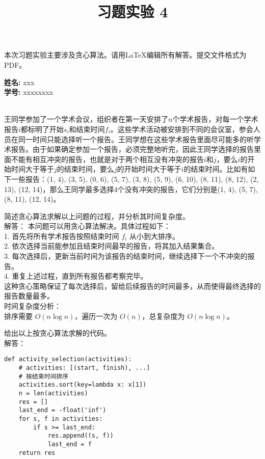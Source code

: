 \documentclass[12pt,twoside]{article}
\title{ 习题实验 4}
\newcommand{\theproblemsetnum}{4}
\newcommand{\releasedate}{2025.4.17}
\begin{document}
\handout{习题实验 \theproblemsetnum}{\releasedate}
本次习题实验主要涉及贪心算法。请用\LaTeX 编辑所有解答。提交文件格式为PDF。

\setlength{\parindent}{0pt}
\medskip\hrulefill\medskip

{\bf 姓名:} xxx\\
{\bf 学号:} xxxxxxxx

\medskip

\medskip\hrulefill

\begin{problems}
\\
王同学参加了一个学术会议，组织者在第一天安排了$n$个学术报告，对每一个学术报告$i$都标明了开始$s_i$和结束时间$f_i$。这些学术活动被安排到不同的会议室，参会人员在同一时间只能选择听一个报告。王同学想在这些学术报告里面尽可能多的听学术报告。由于如果确定参加一个报告，必须完整地听完，因此王同学选择的报告里面不能有相互冲突的报告，也就是对于两个相互没有冲突的报告$i$和$j$，要么$i$的开始时间大于等于$j$的结束时间，要么$j$的开始时间大于等于$i$的结束时间。比如有如下一些报告：(1, 4), (3, 5), (0, 6), (5, 7), (3, 8), (5, 9), (6, 10), (8, 11), (8, 12), (2, 13), (12, 14)，那么王同学最多选择4个没有冲突的报告，它们分别是(1, 4), (5, 7), (8, 11), (12, 14)。
\bparts

\ppart 简述贪心算法求解以上问题的过程，并分析其时间复杂度。\\

解答：
本问题可以用贪心算法解决。具体过程如下：\\
1. 首先将所有学术报告按照结束时间 $f_i$ 从小到大排序。\\
2. 依次选择当前能参加且结束时间最早的报告，将其加入结果集合。\\
3. 每次选择后，更新当前时间为该报告的结束时间，继续选择下一个不冲突的报告。\\
4. 重复上述过程，直到所有报告都考察完毕。\\

这种贪心策略保证了每次选择后，留给后续报告的时间最多，从而使得最终选择的报告数量最多。\\

时间复杂度分析：\\
排序需要 $O(n\log n)$，遍历一次为 $O(n)$，总复杂度为 $O(n\log n)$。

\ppart 给出以上按贪心算法求解的代码。\\

解答：
\begin{verbatim}
def activity_selection(activities):
    # activities: [(start, finish), ...]
    # 按结束时间排序
    activities.sort(key=lambda x: x[1])
    n = len(activities)
    res = []
    last_end = -float('inf')
    for s, f in activities:
        if s >= last_end:
            res.append((s, f))
            last_end = f
    return res


\end{verbatim}
\end{problems}
\end{document}
